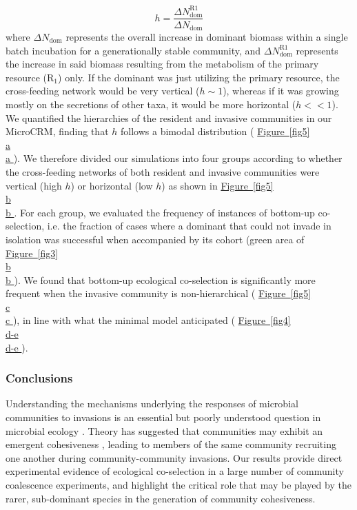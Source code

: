 \documentclass[a4paper,10pt]{article}
\newcommand{\figref}[2][]{%
  \hyperref[{#2}]{%
    Figure~\ref*{#2}%
    \ifx\\#1\\%
    \else
      #1%
    \fi
  }%
}
\begin{document}
\begin{equation}
h = \frac{\Delta N_{\mathrm{dom}}^{\mathrm{R1}}}{\Delta N_{\mathrm{dom}}}
\label{eq:h}
\end{equation}
%
where $\Delta N_{\mathrm{dom}}$ represents the overall increase in dominant biomass
within a single batch incubation for a generationally stable community,
and $\Delta N_{\mathrm{dom}}^{\mathrm{R1}}$
represents the increase in said biomass resulting from the metabolism of the primary resource
($\mathrm{R}_1$) only.
If the dominant was just utilizing the primary resource, the cross-feeding network would be very
vertical ($h \sim 1$),
whereas if it was growing mostly on the secretions of other taxa,
it would be more horizontal ($h << 1$).
We quantified the hierarchies of the resident and invasive communities in our MicroCRM,
finding that $h$ follows a bimodal distribution (\figref[a]{fig5}).
We therefore divided our simulations into four groups according to
whether the cross-feeding networks of both resident and invasive communities were
vertical (high $h$) or horizontal (low $h$) as shown in
\figref[b]{fig5}.
For each group, we evaluated the frequency of instances of bottom-up co-selection,
i.e. the fraction of cases where a dominant that could not invade in isolation
was successful when accompanied by its cohort
(green area of \figref[b]{fig3}).
We found that bottom-up ecological co-selection
is significantly more frequent when the invasive community is
non-hierarchical (\figref[c]{fig5}),
in line with what the minimal model anticipated
(\figref[d-e]{fig4}).

\subsubsection*{Conclusions}

Understanding the mechanisms underlying the responses of microbial communities to invasions is
an essential but poorly understood question in microbial ecology \cite{Rillig2015}.
Theory has suggested that communities may exhibit an emergent cohesiveness
\cite{Gilpin1994,Livingston2013,Tikhonov2016,Tikhonov2017},
leading to members of the same community recruiting one another during
community-community invasions.
Our results provide direct experimental evidence of ecological co-selection in a large number
of community coalescence experiments,
and highlight the critical role that may be played by the rarer, sub-dominant species in the generation
of community cohesiveness.
\end{document}
